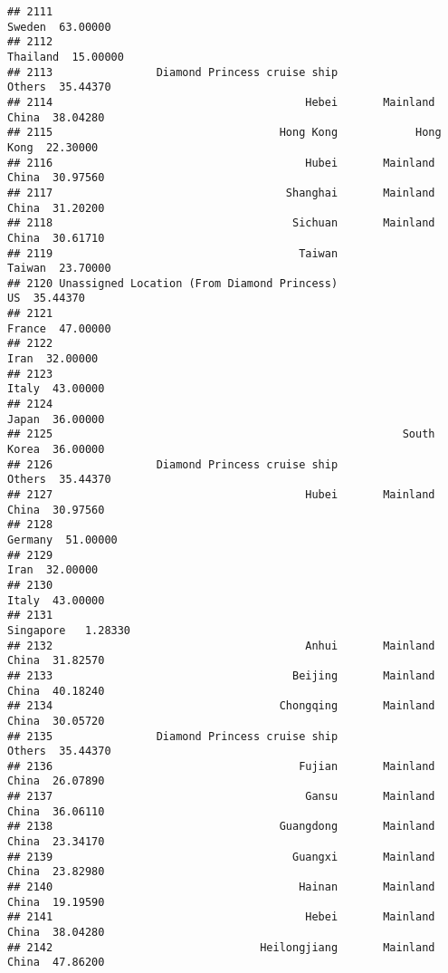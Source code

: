 \documentclass[
]{article}
\begin{document}
\begin{verbatim}
## 2111                                                           Sweden  63.00000
## 2112                                                         Thailand  15.00000
## 2113                Diamond Princess cruise ship               Others  35.44370
## 2114                                       Hebei       Mainland China  38.04280
## 2115                                   Hong Kong            Hong Kong  22.30000
## 2116                                       Hubei       Mainland China  30.97560
## 2117                                    Shanghai       Mainland China  31.20200
## 2118                                     Sichuan       Mainland China  30.61710
## 2119                                      Taiwan               Taiwan  23.70000
## 2120 Unassigned Location (From Diamond Princess)                   US  35.44370
## 2121                                                           France  47.00000
## 2122                                                             Iran  32.00000
## 2123                                                            Italy  43.00000
## 2124                                                            Japan  36.00000
## 2125                                                      South Korea  36.00000
## 2126                Diamond Princess cruise ship               Others  35.44370
## 2127                                       Hubei       Mainland China  30.97560
## 2128                                                          Germany  51.00000
## 2129                                                             Iran  32.00000
## 2130                                                            Italy  43.00000
## 2131                                                        Singapore   1.28330
## 2132                                       Anhui       Mainland China  31.82570
## 2133                                     Beijing       Mainland China  40.18240
## 2134                                   Chongqing       Mainland China  30.05720
## 2135                Diamond Princess cruise ship               Others  35.44370
## 2136                                      Fujian       Mainland China  26.07890
## 2137                                       Gansu       Mainland China  36.06110
## 2138                                   Guangdong       Mainland China  23.34170
## 2139                                     Guangxi       Mainland China  23.82980
## 2140                                      Hainan       Mainland China  19.19590
## 2141                                       Hebei       Mainland China  38.04280
## 2142                                Heilongjiang       Mainland China  47.86200

\end{verbatim}
\end{document}
